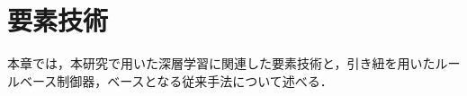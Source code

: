 \chapter{要素技術}

  本章では，本研究で用いた深層学習に関連した要素技術と，引き紐を用いたルールベース制御器，ベースとなる従来手法について述べる．

\label{chap:technology}
%





%
